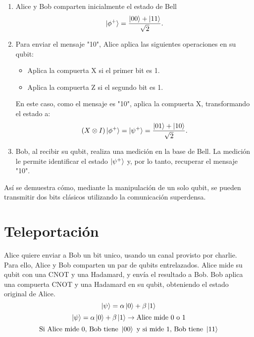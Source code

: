 \documentclass[a4paper,12pt]{article}
\begin{document}
\begin{enumerate}
    \item Alice y Bob comparten inicialmente el estado de Bell
    \[
    \ket{\phi^+} = \frac{\ket{00} + \ket{11}}{\sqrt{2}}.
    \]
    \item Para enviar el mensaje "10", Alice aplica las siguientes operaciones en su qubit:
    \begin{itemize}
        \item Aplica la compuerta X si el primer bit es 1.
        \item Aplica la compuerta Z si el segundo bit es 1.
    \end{itemize}
    En este caso, como el mensaje es "10", aplica la compuerta X, transformando el estado a:
    \[
    (X \otimes I)\ket{\phi^+} = \ket{\psi^+} = \frac{\ket{01} + \ket{10}}{\sqrt{2}}.
    \]
    \item Bob, al recibir su qubit, realiza una medición en la base de Bell. La medición le permite identificar el estado \(\ket{\psi^+}\) y, por lo tanto, recuperar el mensaje "10".
\end{enumerate}

Así se demuestra cómo, mediante la manipulación de un solo qubit, se pueden transmitir dos bits clásicos utilizando la comunicación superdensa.

\section{Teleportación}
Alice quiere enviar a Bob un bit unico, usando un canal provisto por charlie. Para ello, Alice y Bob comparten un par de qubits entrelazados. Alice mide su qubit con una CNOT y una Hadamard, y envía el resultado a Bob. Bob aplica una compuerta CNOT y una Hadamard en su qubit, obteniendo el estado original de Alice.
\[
\ket{\psi} = \alpha \ket{0} + \beta \ket{1}
\]
\[
\ket{\psi} = \alpha \ket{0} + \beta \ket{1} \rightarrow \text{Alice mide } 0 \text{ o } 1
\]
\[
\text{Si Alice mide } 0 \text{, Bob tiene } \ket{00} \text{ y si mide } 1 \text{, Bob tiene } \ket{11}
\]
\end{document}
